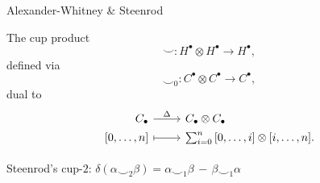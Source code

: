 \documentclass[10pt,t, handout]{beamer} %
\begin{document}
\begin{frame}{Alexander-Whitney \& Steenrod}
	
	
	\vskip -5pt
	The cup product
	\begin{equation*}
	\smallsmile \colon H^\bullet \otimes H^\bullet \to H^\bullet,
	\end{equation*}
	\vskip -9pt
	defined via
	\vskip -9pt
	\begin{equation*}
	\smallsmile_0 \colon C^\bullet \otimes C^\bullet \to C^\bullet,
	\end{equation*}
	dual to 
	\begin{equation*}
	\begin{tikzcd}[
	,row sep = 0ex
	,/tikz/column 1/.append style={anchor=base east}
	,/tikz/column 2/.append style={anchor=base west}
	]
	C_\bullet \arrow[r, "\Delta"] & C_\bullet \otimes C_\bullet \\
	{[0, \dots, n]} \arrow[r, |->] & \sum_{i=0}^{n} {[0, \dots, i] \otimes [i, \dots, n]}.
	\end{tikzcd}
	\end{equation*}
	
	\vskip 15pt
	
	\textcolor{pblue}{Steenrod's cup-$2$:} \quad
	$\delta(\alpha \smallsmile_2 \beta) = \alpha \smallsmile_1 \beta\, -\, \beta \smallsmile_1 \alpha$
\end{frame}
\end{document}
